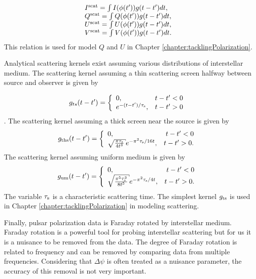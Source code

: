 \begin{equation}
\begin{array}{l}
I^{\rm scat}=\int I(\phi(t')) g(t-t') dt,\\
Q^{\rm scat}=\int Q(\phi(t')) g(t-t') dt,\\
U^{\rm scat}=\int U(\phi(t')) g(t-t') dt,\\
V^{\rm scat}=\int V(\phi(t')) g(t-t') dt.
\end{array}
\end{equation}
This relation is used for model $Q$ and $U$
in Chapter \ref{chapter:tacklingPolarization}.

Analytical scattering kernels exist assuming various distributions
of interstellar medium.  
The scattering kernel assuming a thin scattering screen 
halfway between source and observer is given by 

\begin{equation}\label{eq:gts2}
g_{ts}(t-t')=\left\{
\begin{array}{lr}
0,                       & t-t' < 0 \\
e^{-(t-t') / \tau_{\rm s}},  & t-t' > 0
\end{array}
\right.
\end{equation}
\citep{williamson1972pulse,williamson1973pulse}.
The scattering kernel assuming a thick screen near the
source is given by 
\begin{equation}
g_{\rm ths}(t-t')=\left\{
\begin{array}{lr}
0,                       & t-t' < 0 \\
\sqrt{\frac{\pi \tau_{\rm s}}{4t^3}} e^{-\pi^2\tau_{\rm s}/16t},  & t-t' > 0.
\end{array}
\right.
\end{equation}
The scattering kernel assuming uniform medium is given by
\begin{equation}
g_{\rm um}(t-t')=\left\{
\begin{array}{lr}
0,                       & t-t' < 0 \\
\sqrt{\frac{\pi^5 \tau_{\rm s}^3}{8t^5}} e^{-\pi^2\tau_{\rm s}/4t},  & t-t' > 0.
\end{array}
\right.
\end{equation}
The variable $\tau_{\rm s}$ is a characteristic scattering time.
The simplest kernel $g_{\rm ts}$ is used in Chapter \ref{chapter:tacklingPolarization}  in 
modeling scattering.

Finally, pulsar polarization data is Faraday rotated
by interstellar medium.  Faraday rotation is a powerful
tool for probing interstellar scattering but for us it is 
a nuisance to be removed from the data.  The degree of Faraday rotation
is related to frequency and can be removed by comparing data
from multiple frequencies.  Considering that $\Delta\psi$ is often
treated as a nuisance parameter, the accuracy of this removal
is not very important.  


